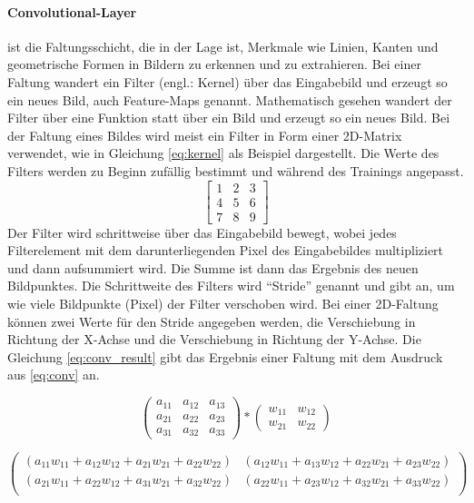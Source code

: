 \paragraph{Convolutional-Layer} ist die Faltungsschicht, die in der Lage ist, Merkmale wie Linien, Kanten und geometrische Formen in Bildern zu erkennen und zu extrahieren. Bei einer Faltung wandert ein Filter (engl.: Kernel) über das Eingabebild und erzeugt so ein neues Bild, auch Feature-Maps genannt. Mathematisch gesehen wandert der Filter über eine Funktion statt über ein Bild und erzeugt so ein neues Bild. Bei der Faltung eines Bildes wird meist ein Filter in Form einer 2D-Matrix verwendet, wie in Gleichung \ref{eq:kernel} als Beispiel dargestellt. Die Werte des Filters werden zu Beginn zufällig bestimmt und während des Trainings angepasst.
\begin{equation}
\begin{bmatrix}
	1 & 2 & 3 \\
	4 & 5 & 6 \\
    7 & 8 & 9
\end{bmatrix}
\label{eq:kernel}
\end{equation}
Der Filter wird schrittweise über das Eingabebild bewegt, wobei jedes Filterelement mit dem darunterliegenden Pixel des Eingabebildes multipliziert und dann aufsummiert wird. Die Summe ist dann das Ergebnis des neuen Bildpunktes. Die Schrittweite des Filters wird ``Stride'' genannt und gibt an, um wie viele Bildpunkte (Pixel) der Filter verschoben wird. Bei einer 2D-Faltung können zwei Werte für den Stride angegeben werden, die Verschiebung in Richtung der X-Achse und die Verschiebung in Richtung der Y-Achse. Die Gleichung \ref{eq:conv_result} gibt das Ergebnis einer Faltung mit dem Ausdruck aus \ref{eq:conv} an.

\begin{equation}
	\begin{pmatrix}
		a_{11} & a_{12} & a_{13} \\
		a_{21} & a_{22} & a_{23} \\
		a_{31} & a_{32} & a_{33}
	\end{pmatrix}
	*
	\begin{pmatrix}
		w_{11} & w_{12} \\
		w_{21} & w_{22}
	\end{pmatrix}
	\label{eq:conv}
\end{equation}

\begin{equation}
	\begin{pmatrix}
		(a_{11}w_{11} + a_{12}w_{12} + a_{21}w_{21} + a_{22}w_{22}) & (a_{12}w_{11} + a_{13}w_{12} + a_{22}w_{21} + a_{23}w_{22}) \\
		(a_{21}w_{11} + a_{22}w_{12} + a_{31}w_{21} + a_{32}w_{22}) & (a_{22}w_{11} + a_{23}w_{12} + a_{32}w_{21} + a_{33}w_{22}) \\
	\end{pmatrix}
	\label{eq:conv_result}
\end{equation}

